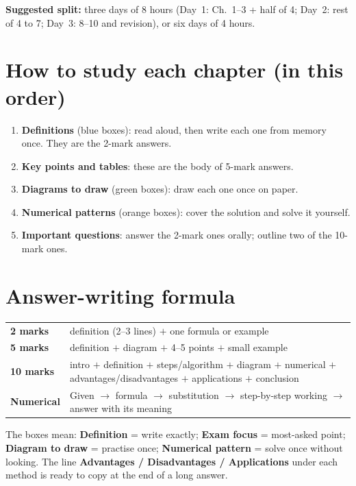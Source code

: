 \textbf{Suggested split:} three days of 8 hours (Day~1: Ch.~1--3 + half of 4; Day~2: rest of 4 to 7; Day~3: 8--10 and revision), or six days of 4 hours.

\section*{How to study each chapter (in this order)}
\begin{enumerate}
  \item \textbf{Definitions} (blue boxes): read aloud, then write each one from memory once. They are the 2-mark answers.
  \item \textbf{Key points and tables}: these are the body of 5-mark answers.
  \item \textbf{Diagrams to draw} (green boxes): draw each one once on paper.
  \item \textbf{Numerical patterns} (orange boxes): cover the solution and solve it yourself.
  \item \textbf{Important questions}: answer the 2-mark ones orally; outline two of the 10-mark ones.
\end{enumerate}

\section*{Answer-writing formula}
\begin{center}
\small
\begin{tabular}{@{}lp{12.0cm}@{}}
\toprule
\textbf{2 marks} & definition (2--3 lines) $+$ one formula or example\\
\textbf{5 marks} & definition $+$ diagram $+$ 4--5 points $+$ small example\\
\textbf{10 marks} & intro $+$ definition $+$ steps/algorithm $+$ diagram $+$ numerical $+$ advantages/disadvantages $+$ applications $+$ conclusion\\
\textbf{Numerical} & Given $\to$ formula $\to$ substitution $\to$ step-by-step working $\to$ answer with its meaning\\
\bottomrule
\end{tabular}
\end{center}

\begin{imp}
The boxes mean: \textbf{Definition} = write exactly; \textbf{Exam focus} = most-asked point; \textbf{Diagram to draw} = practise once; \textbf{Numerical pattern} = solve once without looking. The line \textbf{Advantages / Disadvantages / Applications} under each method is ready to copy at the end of a long answer.
\end{imp}

